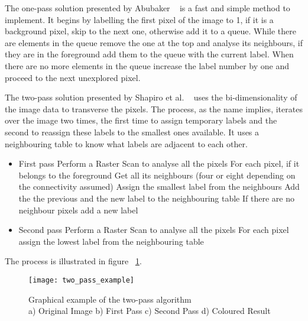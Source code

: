 The one-pass solution presented by Abubaker ~\cite{abubaker_one_2007} is a fast and simple method to implement. It begins by labelling the first pixel of the image to 1, if it is a background pixel, skip to the next one, otherwise add it to a queue. While there are elements in the queue remove the one at the top and analyse its neighbours, if they are in the foreground add them to the queue with the current label. When there are no more elements in the queue increase the label number by one and proceed to the next unexplored pixel.

The two-pass solution presented by Shapiro et al. ~\cite{shapiro_computer_2001} uses the bi-dimensionality of the image data to transverse the pixels. The process, as the name implies, iterates over the image two times, the first time to assign temporary labels and the second to reassign these labels to the smallest ones available. It uses a neighbouring table to know what labels are adjacent to each other.

\begin{itemize}
	\item First pass
		\subitem Perform a Raster Scan to analyse all the pixels
		\subitem For each pixel, if it belongs to the foreground
			\subsubitem Get all its neighbours (four or eight depending on the connectivity assumed)
				\subsubitem Assign the smallest label from the neighbours
				\subsubitem Add the the previous and the new label to the neighbouring table
			\subsubitem If there are no neighbour pixels add a new label
	\item Second pass
		\subitem Perform a Raster Scan to analyse all the pixels
		\subitem For each pixel assign the lowest label from the neighbouring table
\end{itemize}

The process is illustrated in figure ~\ref{fig:two_pass_example}.

\begin{figure}[h]
  \begin{center}
    \leavevmode
    \texttt{[image: two\_pass\_example]}
    \captionsetup{justification=centering}
    \caption{Graphical example of the two-pass algorithm ~\cite{wikipedia_connected_2017}\\a) Original Image b) First Pass c) Second Pass d) Coloured Result}
    \label{fig:two_pass_example}
  \end{center}
\end{figure}

